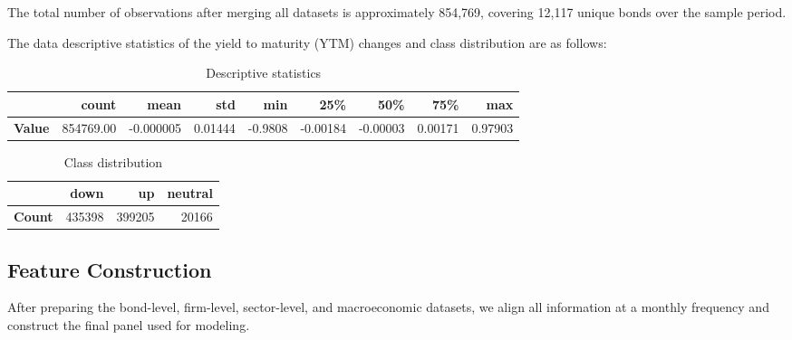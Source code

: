 \documentclass[12pt]{article}
\begin{document}
The total number of observations after merging all datasets is approximately 854,769, covering 12,117 unique bonds over the sample period.

The data descriptive statistics of the yield to maturity (YTM) changes and class distribution are as follows:

\begin{table}[H]
\centering
\begin{tabular}{lrrrrrrrr}
\hline
 & \textbf{count} & \textbf{mean} & \textbf{std} & \textbf{min} & \textbf{25\%} & \textbf{50\%} & \textbf{75\%} & \textbf{max} \\
\hline
\textbf{Value} &
854769.00 &
-0.000005 &
0.01444 &
-0.9808 &
-0.00184 &
-0.00003 &
0.00171 &
0.97903 \\
\hline
\end{tabular}
\caption{Descriptive statistics}
\end{table}

\begin{table}[H]
\centering
\begin{tabular}{lrrr}
\hline
 & \textbf{down} & \textbf{up} & \textbf{neutral} \\
\hline
\textbf{Count} & 435398 & 399205 & 20166 \\
\hline
\end{tabular}
\caption{Class distribution}
\end{table}

\subsection{Feature Construction}
After preparing the bond-level, firm-level, sector-level, and macroeconomic datasets, we align all information at a monthly frequency and construct the final panel used for modeling. 
\end{document}
